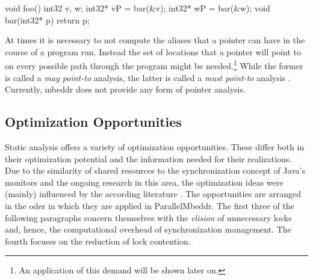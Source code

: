 \begin{ccode}
void foo() {
  int32 v, w;
  int32* vP = bar(&v);
  int32* wP = bar(&w);
}
void bar(int32* p) {
  return p;
}
\end{ccode}
At times it is necessary to not compute the aliases that a pointer can have in the course of a program run. Instead the set of locations that a pointer will point to on every possible path through the program might be needed.\footnote{An application of this demand will be shown later on.} While the former is called a \textit{may point-to} analysis, the latter is called a \textit{must point-to} analysis \cite{ProgramAnalysisAndSpecialization}.
Currently, mbeddr does not provide any form of pointer analysis.

\subsection{Optimization Opportunities}
Static analysis offers a variety of optimization opportunities. These differ both in their optimization potential and the information needed for their realizations. Due to the similarity of shared resources to the synchronization concept of Java's monitors and the ongoing research in this area, the optimization ideas were (mainly) influenced by the according literature \cite{StaticAnalysesForJava}\cite{JavaTheoryAndPractice}\cite{DoJava6Threading}. The opportunities are arranged in the oder in which they are applied in ParallelMbeddr. The first three of the following paragraphs concern themselves with the \textit{elision} of unnecessary locks and, hence, the computational overhead of synchronization management. The fourth focuses on the reduction of lock contention.

